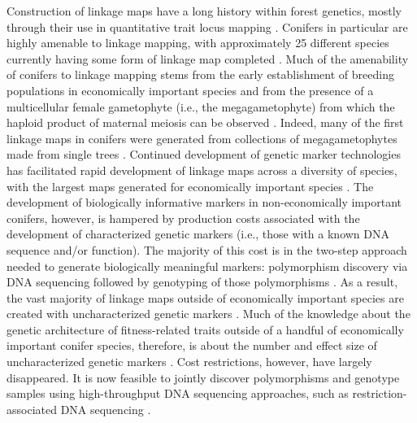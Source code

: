 \documentclass[11pt]{article}
\begin{document}
Construction of linkage maps have a long history within forest genetics, mostly through their use in quantitative trait locus 
mapping \citep{Ritland:2011}. Conifers in particular are highly amenable to linkage mapping, with approximately 25 different 
species currently having some form of linkage map completed \citep[see Table 5-1 in][]{Ritland:2011}. Much of the amenability of 
conifers to linkage mapping stems from the early establishment of breeding populations in economically important species and from 
the presence of a multicellular female gametophyte (i.e., the megagametophyte) from which the haploid product of maternal meiosis 
can be observed \citep{Cairney:2007}. Indeed, many of the first linkage maps in conifers were generated from collections of 
megagametophytes made from single trees \citep{Tulsieram:1992, Nelson:1993, Kubisiak:1996}. Continued development 
of genetic marker technologies has facilitated rapid development of linkage maps across a diversity of species, with the largest maps 
generated for economically important species \citep[e.g.][] {Achere:2004, Kang:2010, Martinez-Garcia:2013}. 
The development of biologically informative markers in non-economically important conifers, however, is hampered by production costs 
associated with the development of characterized  genetic markers (i.e., those with a known DNA sequence and/or function). 
The majority of this cost is in the two-step approach needed to generate biologically 
meaningful markers: polymorphism discovery via DNA sequencing followed by genotyping of those polymorphisms 
\citep[cf.][]{Eckert:2013a}. As a result, the vast majority of linkage maps outside of economically important 
species are created with uncharacterized genetic markers \citep[e.g.,][]{Travis:1998}. Much of the knowledge about the genetic 
architecture of fitness-related traits outside of a handful of economically important conifer species, therefore, is about the 
number and effect size of uncharacterized genetic markers \citep{Ritland:2011}. Cost restrictions, however, have largely disappeared. 
It is now feasible to jointly discover polymorphisms and genotype samples using high-throughput DNA sequencing 
approaches, such as restriction-associated DNA sequencing \citep [RADseq; e.g.,][] {Peterson:2012}. 
\end{document}
